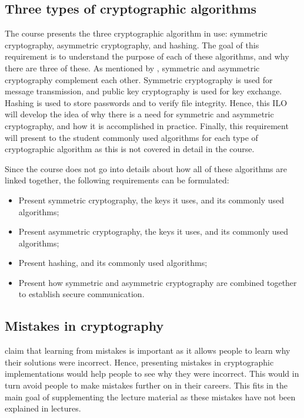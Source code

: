 \documentclass{l4proj}
\begin{document}
\subsection{Three types of cryptographic algorithms}

The course presents the three cryptographic algorithm in use: symmetric cryptography,
asymmetric cryptography, and hashing. 
The goal of this requirement is to understand the purpose of each of these algorithms,
and why there are three of these. As mentioned by \citet{kessler_overview_2016},
symmetric and asymmetric cryptography complement each other. 
Symmetric cryptography is used for message transmission, and public key cryptography 
is used for key exchange. Hashing is used to store passwords and to verify file integrity.
Hence, this ILO will develop the idea of why there is a need for symmetric and asymmetric
cryptography, and how it is accomplished in practice.
Finally, this requirement will present to the student commonly used algorithms for each
type of cryptographic algorithm as this is not covered in detail in the course.

Since the course does not go into details about how all of these algorithms are 
linked together, the following requirements can be formulated:
\begin{itemize}
    \item Present symmetric cryptography, the keys it uses, and its commonly used algorithms;
    \item Present asymmetric cryptography, the keys it uses, and its commonly used algorithms;
    \item Present hashing, and its commonly used algorithms;
    \item Present how symmetric and asymmetric cryptography are combined together
    to establish secure communication.
\end{itemize}

\subsection{Mistakes in cryptography}

\citet{eggleton_value_2001} claim that learning from mistakes is important as it allows people to 
learn why their solutions were incorrect. Hence, presenting mistakes in 
cryptographic implementations would help people to see why they were incorrect.
This would in turn avoid people to make mistakes further on in their careers.
This fits in the main goal of supplementing the lecture material as these mistakes 
have not been explained in lectures.
\end{document}
